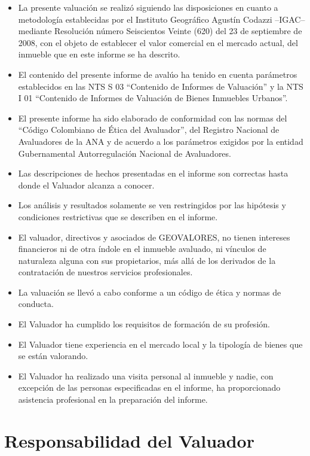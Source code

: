 \documentclass[12pt,a4paper,twoside]{article}
\begin{document}
{\begin{itemize}
	\item La presente valuación se realizó siguiendo las disposiciones en cuanto a metodología establecidas por el Instituto Geográfico Agustín Codazzi –IGAC– mediante Resolución número Seiscientos Veinte (620) del 23 de septiembre de 2008, con el objeto de establecer el valor comercial en el mercado actual, del inmueble que en este informe se ha descrito.
	\item El contenido del presente informe de avalúo ha tenido en cuenta parámetros establecidos en las NTS S 03 “Contenido de Informes de Valuación” y la NTS I 01 “Contenido de Informes de Valuación de Bienes Inmuebles Urbanos”.
	\item El presente informe ha sido elaborado de conformidad con las normas del “Código Colombiano de Ética del Avaluador”, del Registro Nacional de Avaluadores de la ANA y de acuerdo a los parámetros exigidos por la entidad Gubernamental Autorregulación Nacional de Avaluadores.
	\item Las descripciones de hechos presentadas en el informe son correctas hasta donde el Valuador alcanza a conocer.
	\item Los análisis y resultados solamente se ven restringidos por las hipótesis y condiciones restrictivas que se describen en el informe.
	\item El valuador, directivos y asociados de GEOVALORES, no tienen intereses financieros ni de otra índole en el inmueble avaluado, ni vínculos de naturaleza alguna con sus propietarios, más allá de los derivados de la contratación de nuestros servicios profesionales.
	\item La valuación se llevó a cabo conforme a un código de ética y normas de conducta.
	\item El Valuador ha cumplido los requisitos de formación de su profesión.
	\item El Valuador tiene experiencia en el mercado local y la tipología de bienes que se están valorando.
	\item El Valuador ha realizado una visita personal al inmueble y nadie, con excepción de las personas especificadas en el informe, ha proporcionado asistencia profesional en la preparación del informe.
	
\end{itemize}

\section{Responsabilidad del Valuador}

}
\end{document}
